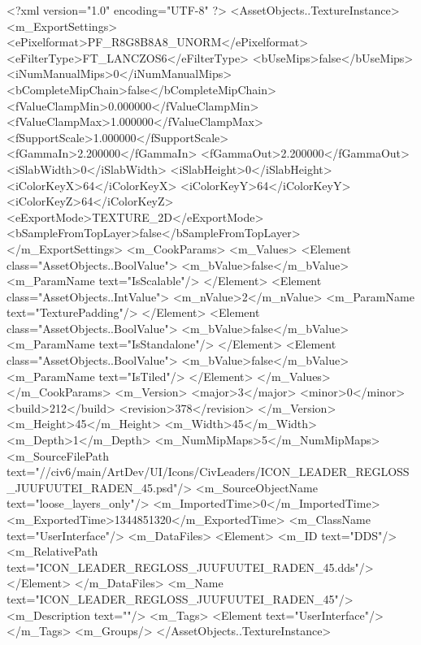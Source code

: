 <?xml version="1.0" encoding="UTF-8" ?>
<AssetObjects..TextureInstance>
	<m_ExportSettings>
		<ePixelformat>PF_R8G8B8A8_UNORM</ePixelformat>
		<eFilterType>FT_LANCZOS6</eFilterType>
		<bUseMips>false</bUseMips>
		<iNumManualMips>0</iNumManualMips>
		<bCompleteMipChain>false</bCompleteMipChain>
		<fValueClampMin>0.000000</fValueClampMin>
		<fValueClampMax>1.000000</fValueClampMax>
		<fSupportScale>1.000000</fSupportScale>
		<fGammaIn>2.200000</fGammaIn>
		<fGammaOut>2.200000</fGammaOut>
		<iSlabWidth>0</iSlabWidth>
		<iSlabHeight>0</iSlabHeight>
		<iColorKeyX>64</iColorKeyX>
		<iColorKeyY>64</iColorKeyY>
		<iColorKeyZ>64</iColorKeyZ>
		<eExportMode>TEXTURE_2D</eExportMode>
		<bSampleFromTopLayer>false</bSampleFromTopLayer>
	</m_ExportSettings>
	<m_CookParams>
		<m_Values>
			<Element class="AssetObjects..BoolValue">
				<m_bValue>false</m_bValue>
				<m_ParamName text="IsScalable"/>
			</Element>
			<Element class="AssetObjects..IntValue">
				<m_nValue>2</m_nValue>
				<m_ParamName text="TexturePadding"/>
			</Element>
			<Element class="AssetObjects..BoolValue">
				<m_bValue>false</m_bValue>
				<m_ParamName text="IsStandalone"/>
			</Element>
			<Element class="AssetObjects..BoolValue">
				<m_bValue>false</m_bValue>
				<m_ParamName text="IsTiled"/>
			</Element>
		</m_Values>
	</m_CookParams>
	<m_Version>
		<major>3</major>
		<minor>0</minor>
		<build>212</build>
		<revision>378</revision>
	</m_Version>
	<m_Height>45</m_Height>
	<m_Width>45</m_Width>
	<m_Depth>1</m_Depth>
	<m_NumMipMaps>5</m_NumMipMaps>
	<m_SourceFilePath text="//civ6/main/ArtDev/UI/Icons/CivLeaders/ICON_LEADER_REGLOSS_JUUFUUTEI_RADEN_45.psd"/>
	<m_SourceObjectName text="loose_layers_only"/>
	<m_ImportedTime>0</m_ImportedTime>
	<m_ExportedTime>1344851320</m_ExportedTime>
	<m_ClassName text="UserInterface"/>
	<m_DataFiles>
		<Element>
			<m_ID text="DDS"/>
			<m_RelativePath text="ICON_LEADER_REGLOSS_JUUFUUTEI_RADEN_45.dds"/>
		</Element>
	</m_DataFiles>
	<m_Name text="ICON_LEADER_REGLOSS_JUUFUUTEI_RADEN_45"/>
	<m_Description text=""/>
	<m_Tags>
		<Element text="UserInterface"/>
	</m_Tags>
	<m_Groups/>
</AssetObjects..TextureInstance>

